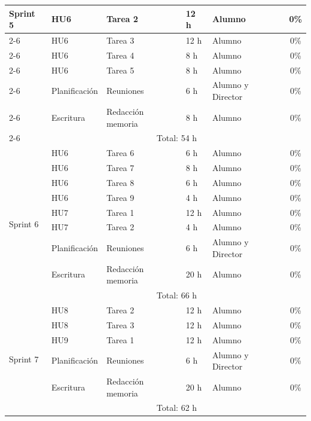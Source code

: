 \documentclass[
11pt, %
]{charter}
\begin{document}
\begin{longtable}{|l|l|p{3cm}|p{1cm}|p{2cm}|c|}
\multirow{7}{*}{Sprint 5} 
 & HU6 & Tarea 2 & 12 h & Alumno                       & 0\% \\ \cline{2-6} 
 & HU6 & Tarea 3 & 12 h & Alumno                       & 0\% \\ \cline{2-6} 
 & HU6 & Tarea 4 & 8 h & Alumno                       & 0\% \\ \cline{2-6} 
 & HU6 & Tarea 5 & 8 h & Alumno                       & 0\% \\ \cline{2-6} 
 & Planificación & Reuniones & 6 h & Alumno y Director  & 0\% \\ \cline{2-6}
 & Escritura & Redacción memoria & 8 h & Alumno         & 0\% \\ \cline{2-6}
 & \multicolumn{5}{|c|}{Total: 54 h} \\ \hline \hline

\multirow{9}{*}{Sprint 6} 
 & HU6 & Tarea 6 & 6 h & Alumno                       & 0\% \\ \cline{2-6} 
 & HU6 & Tarea 7 & 8 h & Alumno                       & 0\% \\ \cline{2-6} 
 & HU6 & Tarea 8 & 6 h & Alumno                       & 0\% \\ \cline{2-6} 
 & HU6 & Tarea 9 & 4 h & Alumno                       & 0\% \\ \cline{2-6} 
 & HU7 & Tarea 1 & 12 h & Alumno                       & 0\% \\ \cline{2-6} 
 & HU7 & Tarea 2 & 4 h & Alumno                       & 0\% \\ \cline{2-6} 
 & Planificación & Reuniones & 6 h & Alumno y Director  & 0\% \\ \cline{2-6}
 & Escritura & Redacción memoria & 20 h & Alumno         & 0\% \\ \cline{2-6}
 & \multicolumn{5}{|c|}{Total: 66 h} \\ \hline \hline

\multirow{6}{*}{Sprint 7} 
 & HU8 & Tarea 2 & 12 h & Alumno                       & 0\% \\ \cline{2-6} 
 & HU8 & Tarea 3 & 12 h & Alumno                       & 0\% \\ \cline{2-6} 
 & HU9 & Tarea 1 & 12 h & Alumno                       & 0\% \\ \cline{2-6} 
 & Planificación & Reuniones & 6 h & Alumno y Director  & 0\% \\ \cline{2-6}
 & Escritura & Redacción memoria & 20 h & Alumno         & 0\% \\ \cline{2-6}
 & \multicolumn{5}{|c|}{Total: 62 h} \\ \hline \hline


\end{longtable}
\end{document}
